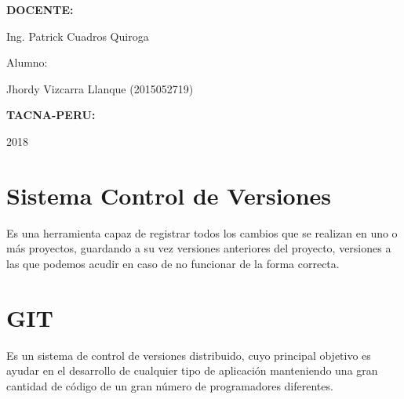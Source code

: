 \documentclass[12pt,letterpaper]{article}
\begin{document}
\begin{titlepage}
\begin{center}
\vspace*{0.3in}
\begin{Large}
\textbf{DOCENTE:} \\
\end{Large}

\vspace*{0.1in}
\begin{large}
 Ing. Patrick Cuadros Quiroga\\
\end{large}

\vspace*{0.2in}
\vspace*{0.1in}
\begin{large}
Alumno: \\
\begin{flushleft}
Jhordy Vizcarra Llanque	           \hfill	(2015052719) \\
\end{flushleft}
\end{large}

\vspace*{0.3in}
\begin{Large}
\textbf{TACNA-PERU:} \\
\end{Large}

\vspace*{0.1in}
\begin{large}
2018\\
\end{large}

\end{center}

\end{titlepage}


\section{Sistema Control de Versiones}

Es una herramienta capaz de registrar todos los cambios que se realizan en uno o más proyectos, guardando a su vez versiones anteriores del proyecto, versiones a las que podemos acudir en caso de no funcionar de la forma correcta.


\section{GIT}
Es un sistema de control de versiones distribuido, cuyo principal objetivo es ayudar en el desarrollo de cualquier tipo de aplicación manteniendo una gran cantidad de código de un gran número de programadores diferentes. 
\end{document}
